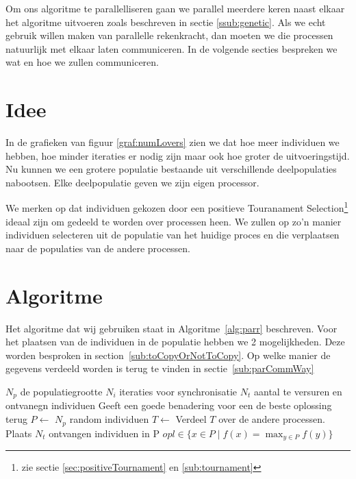 %

Om ons algoritme te parallelliseren gaan we parallel meerdere keren naast elkaar het algoritme uitvoeren zoals beschreven in sectie \ref{ssub:genetic}. Als we echt gebruik willen maken van parallelle rekenkracht, dan moeten we die processen natuurlijk met elkaar laten communiceren.   In de volgende secties bespreken we wat en hoe we zullen communiceren.
\section{Idee}
\label{sec:idee}
In de grafieken van figuur \ref{graf:numLovers} zien we dat hoe meer individuen we hebben, hoe minder iteraties er nodig zijn maar ook hoe groter de uitvoeringstijd. Nu kunnen we een grotere populatie bestaande uit verschillende deelpopulaties nabootsen. Elke deelpopulatie geven we zijn eigen processor.  

We merken op dat individuen gekozen door een positieve Touranament Selection\footnote{zie sectie \ref{sec:positiveTournament} en \ref{sub:tournament}} ideaal zijn om gedeeld te worden over processen heen. We zullen op zo'n manier individuen selecteren uit de populatie van het huidige proces en die verplaatsen naar de populaties van de andere processen. 

\section{Algoritme}
Het algoritme dat wij gebruiken staat in Algoritme~\ref{alg:parr} beschreven. Voor het plaatsen van de individuen in de populatie hebben we 2 mogelijkheden. Deze worden besproken in section~\ref{sub:toCopyOrNotToCopy}. Op welke manier de gegevens verdeeld worden is terug te vinden in sectie~\ref{sub:parCommWay}
	\begin{algorithm}[H]
	 	\caption{}
		\begin{algorithmic}
		\Require 
			\State $N_p$ de populatiegrootte
			\State $N_i$ iteraties voor synchronisatie
			\State $N_t$ aantal te versuren en ontvanegn individuen
		\Ensure Geeft een goede benadering voor een de beste oplossing terug
			\State $P \gets $ $N_p$ random individuen
			\State {}
			\State $T \gets$ 
			\State Verdeel $T$ over de andere processen.
			\State Plaats $N_t$ ontvangen individuen in P
			\EndWhile
			\State \Return  $\displaystyle opl \in \lbrace x \in P \mid f(x) = \max_{y\in P}{f(y)}  \rbrace$
		\EndFunction
		\end{algorithmic}
		\label{alg:parr}
	\end{algorithm}		

